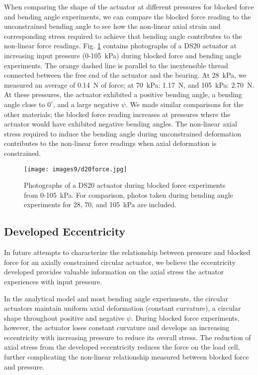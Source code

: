 When comparing the shape of the actuator at different pressures for blocked force and bending angle experiments, we can compare the blocked force reading to the unconstrained bending angle to see how the non-linear axial strain and corresponding stress required to achieve that bending angle contributes to the non-linear force readings. Fig. \ref{fig:d20force} contains photographs of a DS20 actuator at increasing input pressure (0-105~kPa) during blocked force and bending angle experiments. The orange dashed line is parallel to the inextensible thread connected between the free end of the actuator and the bearing. At 28~kPa, we measured an average of 0.14~N of force; at 70~kPa: 1.17~N, and 105~kPa: 2.70~N. At these pressures, the actuator exhibited a positive bending angle, a bending angle close to $0^\circ$, and a large negative $\psi$. We made similar comparisons for the other materials; the blocked force reading increases at pressures where the actuator would have exhibited negative bending angles. The non-linear axial stress required to induce the bending angle during unconstrained deformation contributes to the non-linear force readings when axial deformation is constrained. 

\begin{figure}[ht]
    \centering
     \texttt{[image: images9/d20force.jpg]}
    \caption{Photographs of a DS20 actuator during blocked force experiments from 0-105~kPa. For comparison, photos taken during bending angle experiments for 28, 70, and 105~kPa are included.}
    \label{fig:d20force}
\end{figure}

\clearpage
\subsection{Developed Eccentricity}
\label{section:eccentricity}

In future attempts to characterize the relationship between pressure and blocked force for an axially constrained circular actuator, we believe the eccentricity developed provides valuable information on the axial stress the actuator experiences with input pressure. 

In the analytical model and most bending angle experiments, the circular actuators maintain uniform axial deformation (constant curvature), a circular shape throughout positive and negative $\psi$. During blocked force experiments, however, the actuator loses constant curvature and develops an increasing eccentricity with increasing pressure to reduce its overall stress. The reduction of axial stress from the developed eccentricity reduces the force on the load cell, further complicating the non-linear relationship measured between blocked force and pressure. 

